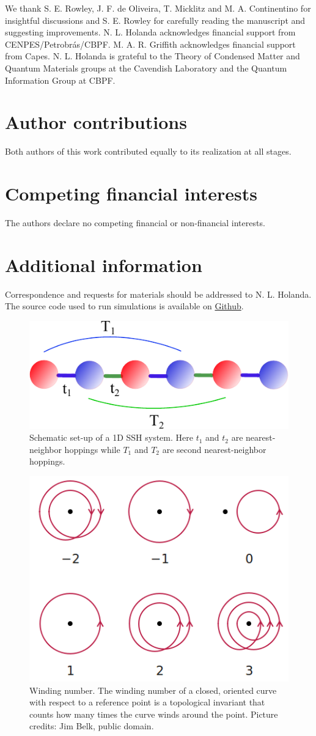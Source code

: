 \documentclass[fleqn,10pt]{wlscirep}
\begin{document}
We thank S. E. Rowley, J. F. de Oliveira, T. Micklitz and M. A. Continentino for insightful discussions and S. E. Rowley for carefully reading the manuscript and suggesting improvements. N. L. Holanda acknowledges financial support from CENPES/Petrobr\'as/CBPF. M. A. R. Griffith acknowledges financial support from Capes. N. L. Holanda is grateful to the Theory of Condensed Matter and Quantum Materials groups at the Cavendish Laboratory and the Quantum Information Group at CBPF.


\section*{Author contributions}

Both authors of this work contributed equally to its realization at all stages.

\section*{Competing financial interests}

The authors declare no competing financial or non-financial interests.

\section*{Additional information}

Correspondence and requests for materials should be addressed to N. L. Holanda. The source code used to run simulations is available on \href{https://github.com/linneuholanda/ml_topological_phases_in_real_space}{Github}.




\newpage

\begin{figure}
  \centering
  \includegraphics[width=.37\textwidth]{./phase_diagrams/ssh_model.pdf}
  \caption{Schematic set-up of a 1D SSH system. Here $t_1$ and $t_2$ are nearest-neighbor hoppings while $T_1$ and $T_2$ are second nearest-neighbor hoppings.}
\label{fig:model}
\end{figure}

\begin{figure}%
  \centering
  \includegraphics[width=.37\textwidth]{./phase_diagrams/winding.png}
  \caption{Winding number. The winding number of a closed, oriented curve with respect to a reference point is a topological invariant that counts how many times the curve winds around the point. Picture credits: Jim Belk, public domain.}
\label{fig:winding}
\end{figure}
\end{document}
